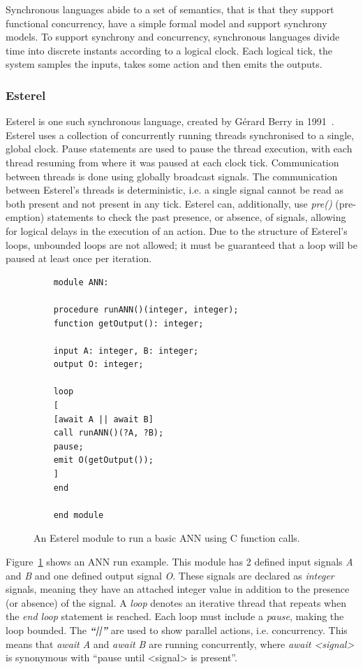 Synchronous languages abide to a set of semantics, that is that they support functional concurrency, have a simple formal model and support synchrony models.
To support synchrony and concurrency, synchronous languages divide time into discrete instants according to a logical clock.
Each logical tick, the system samples the inputs, takes some action and then emits the outputs.

\subsubsection{Esterel}
Esterel is one such synchronous language, created by Gérard Berry in 1991~\cite{berry1991}. 
Esterel uses a collection of concurrently running threads synchronised to a single, global clock.
Pause statements are used to pause the thread execution, with each thread resuming from where it was paused at each clock tick.
Communication between threads is done using globally broadcast signals.
The communication between Esterel's threads is deterministic, i.e. a single signal cannot be read as both present and not present in any tick.
Esterel can, additionally, use \textit{pre()} (pre-emption) statements to check the past presence, or absence, of signals, allowing for logical delays in the execution of an action.
Due to the structure of Esterel's loops, unbounded loops are not allowed; it must be guaranteed that a loop will be paused at least once per iteration.

\begin{figure}[h]
	\begin{lstlisting}
	module ANN:
	
	procedure runANN()(integer, integer);
	function getOutput(): integer;
	
	input A: integer, B: integer;
	output O: integer;
	
	loop
	[
	[await A || await B] 
	call runANN()(?A, ?B);
	pause;
	emit O(getOutput());
	]
	end
	
	end module
	\end{lstlisting}
	\caption{An Esterel module to run a basic \ac{ANN} using C function calls.}
	\label{fig:esterel-abro}
\end{figure}

Figure~\ref{fig:esterel-abro} shows an \ac{ANN} run example.
This module has 2 defined input signals \textit{A} and \textit{B} and one defined output signal \textit{O}.
These signals are declared as \textit{integer} signals, meaning they have an attached integer value in addition to the presence (or absence) of the signal.
A \textit{loop} denotes an iterative thread that repeats when the \textit{end loop} statement is reached.
Each loop must include a \textit{pause}, making the loop bounded. 
The \textbf{\emph{``||''}} are used to show parallel actions, i.e. concurrency.
This means that \textit{await A} and \textit{await B} are running concurrently, where \textit{await <signal>} is synonymous with ``pause until <signal> is present''.

